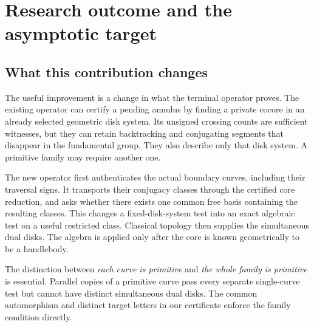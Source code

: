 \documentclass[11pt,a4paper]{article}
\theoremstyle{definition}
\theoremstyle{remark}
\begin{document}
\section{Research outcome and the asymptotic target}
\label{sec:outcome}

\subsection{What this contribution changes}

The useful improvement is a change in what the terminal operator proves.
The existing operator can certify a pending annulus by finding a private
cocore in an already selected geometric disk system. Its unsigned crossing
counts are sufficient witnesses, but they can retain backtracking and
conjugating segments that disappear in the fundamental group. They also
describe only that disk system. A primitive family may require another one.

The new operator first authenticates the actual boundary curves, including
their traversal signs. It transports their conjugacy classes through the
certified core reduction, and asks whether there exists one common free
basis containing the resulting classes. This changes a fixed-disk-system
test into an exact algebraic test on a useful restricted class. Classical
topology then supplies the simultaneous dual disks. The algebra is applied
only after the core is known geometrically to be a handlebody.

The distinction between \emph{each curve is primitive} and \emph{the whole
family is primitive} is essential. Parallel copies of a primitive curve
pass every separate single-curve test but cannot have distinct simultaneous
dual disks. The common automorphism and distinct target letters in our
certificate enforce the family condition directly.
\end{document}
